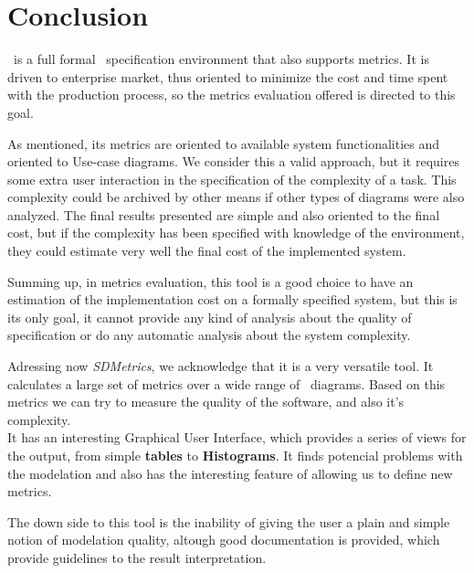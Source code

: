 \section{Conclusion} \label{conc}
\entArch\ is a full formal \uml\ specification environment that also supports metrics. 
It is driven to enterprise market, thus oriented to minimize the cost and time spent with the production process, so the metrics evaluation offered is directed to this goal.

As mentioned, its metrics are oriented to available system functionalities and oriented to Use-case diagrams. 
We consider this a valid approach, but it requires some extra user interaction in the specification of the complexity of a task.
This complexity could be archived by other means if other types of diagrams were also analyzed.
The final results presented are simple and also oriented to the final cost, but if the complexity has been specified with knowledge of the environment, they could estimate very well the final cost of the implemented system.

Summing up, in metrics evaluation, this tool is a good choice to have an estimation of the implementation cost on a formally specified system, but this is its only goal, it cannot provide any kind of analysis about the quality of specification or do any automatic analysis about the system complexity.

Adressing now \textit{SDMetrics}, we acknowledge that it is a very versatile tool. It calculates a large set of metrics over a wide range of \uml\ diagrams. Based on this metrics we can try to measure the quality of the software, and also it's complexity.\\
It has an interesting Graphical User Interface, which provides a series of views for the output, from simple \textbf{tables} to \textbf{Histograms}. It finds potencial problems with the modelation and also has the interesting feature of allowing us to define new metrics.

The down side to this tool is the inability of giving the user a plain and simple notion of modelation quality, altough good documentation is provided,  which provide guidelines to the result interpretation.
 

